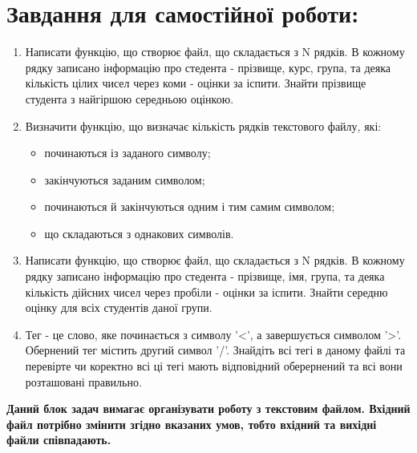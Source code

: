 \documentclass[a5paper,titlepage,openany,twoside,draft]{book_unv}%
\begin{document}
\section{Завдання для самостійної роботи:}

\begin{enumerate}
\def\labelenumi{\arabic{enumi})}
\setcounter{enumi}{4}

\item
  Написати функцію, що створює файл, що складається з N рядків. В кожному рядку
записано інформацію про стедента - прізвище, курс, група, та деяка 
кількість цілих чисел через коми - оцінки за іспити.
Знайти прізвище студента з найгіршою середньою оцінкою.

\item
Визначити функцію, що визначає кількість рядків текстового файлу,
які:
\begin{itemize}
\item починаються із заданого символу;
\item закінчуються заданим символом;
\item починаються й закінчуються одним і тим самим символом;
\item що складаються з однакових символів.
\end{itemize}

\item
  Написати функцію, що створює файл, що складається з N рядків. В кожному рядку
записано інформацію про стедента - прізвище, імя, група, та деяка 
кількість дійсних чисел через пробіли - оцінки за іспити.
Знайти середню оцінку для всіх студентів даної групи.

\item
Тег - це слово, яке починається з символу '\textless{}', а завершується
символом '\textgreater{}'. Обернений тег містить другий символ '/'.
 Знайдіть всі тегі в даному файлі та перевірте чи коректно всі
ці тегі мають відповідний оберернений та всі вони розташовані 
правильно.
\end{enumerate}
\textbf{Даний блок задач вимагає організувати роботу з текстовим файлом. 
Вхідний файл потрібно змінити згідно вказаних умов, тобто вхідний та вихідні файли
співпадають.}
\end{document}
